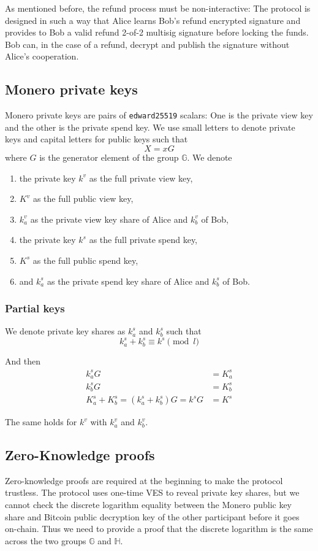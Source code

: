 \documentclass{llncs}
\newcommand{\GG}{\mathbb{G}}
\newcommand{\HH}{\mathbb{H}}
\begin{document}
As mentioned before, the refund process must be non-interactive: The protocol is designed in such a way that Alice learns Bob's refund encrypted signature and provides to Bob a valid refund 2-of-2 multisig signature before locking the funds. Bob can, in the case of a refund, decrypt and publish the signature without Alice's cooperation.

\subsection{Monero private keys}
Monero private keys are pairs of \texttt{edward25519} scalars: One is the private view key and the other is the private spend key. We use small letters to denote private keys and capital letters for public keys such that
$$X = xG$$
where $G$ is the generator element of the group $\GG$. We denote
\begin{enumerate}[label=(\roman*)]
    \item the private key $k^v$ as the full private view key,
    \item $K^v$ as the full public view key,
    \item $k^v_a$ as the private view key share of Alice and $k^v_b$ of Bob,
    \item the private key $k^s$ as the full private spend key,
    \item $K^s$ as the full public spend key,
    \item and $k^s_a$ as the private spend key share of Alice and $k^s_b$ of Bob.
\end{enumerate}

\subsubsection{Partial keys}
We denote private key shares as $k^s_a$ and $k^s_b$ such that
$$k^s_a + k^s_b \equiv k^s \pmod l$$

And then
\begin{equation}
\begin{split}
    k^s_aG &= K^s_a \\
    k^s_bG &= K^s_b \\
    K^s_a + K^s_b = (k^s_a + k^s_b)G = k^sG &= K^s
\end{split}
\end{equation}

The same holds for $k^v$ with $k^v_a$ and $k^v_b$.

\subsection{Zero-Knowledge proofs}
\label{eqDiscreteLog}
Zero-knowledge proofs are required at the beginning to make the protocol trustless. The protocol uses one-time VES to reveal private key shares, but we cannot check the discrete logarithm equality between the Monero public key share and Bitcoin public decryption key of the other participant before it goes on-chain. Thus we need to provide a proof that the discrete logarithm is the same across the two groups $\GG$ and $\HH$.
\end{document}
